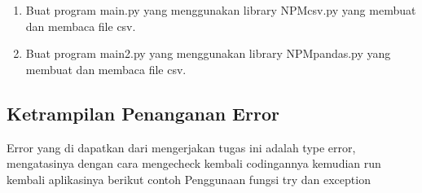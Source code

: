 \begin{enumerate}
			\item Buat program main.py yang menggunakan library NPMcsv.py yang membuat dan membaca file csv.			
			
			
			\item Buat program main2.py yang menggunakan library NPMpandas.py yang membuat dan membaca file csv.			
			
			
		\end{enumerate}
	
	\subsection{Ketrampilan Penanganan Error}
			Error yang di dapatkan dari mengerjakan tugas ini adalah type error, mengatasinya dengan cara mengecheck kembali codingannya
			kemudian run kembali aplikasinya
			berikut contoh Penggunaan fungsi try dan exception
				
